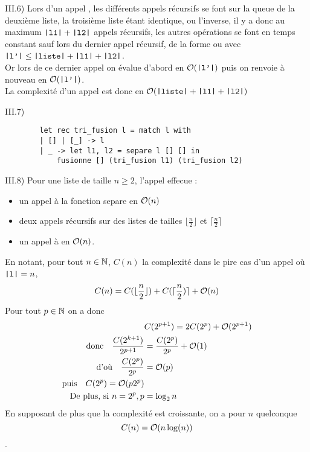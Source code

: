 \begin{question}{III.6) }
    Lors d'un appel , les différents appels récursifs se font sur la queue de la deuxième liste, la troisième liste étant identique, ou l'inverse, il y a donc au maximum $\texttt{|l1|} + \texttt{|l2|}$ appels récursifs, les autres opérations se font en temps constant sauf lors du dernier appel récursif, de la forme  ou  avec $\texttt{|l'|} \leq \texttt{|liste|} + \texttt{|l1|} + \texttt{|l2|}$.\\Or lors de ce dernier appel on évalue d'abord  en $\mathcal{O}(\texttt{|l'|})$ puis on renvoie  à nouveau en $\mathcal{O}(\texttt{|l'|})$. \\ La complexité d'un appel  est donc en $\mathcal{O}(\texttt{|liste|} + \texttt{|l1|} + \texttt{|l2|})$
\end{question}

\begin{question}{III.7) }
    \begin{verbatim}
        let rec tri_fusion l = match l with
        | [] | [_] -> l
        | _ -> let l1, l2 = separe l [] [] in
            fusionne [] (tri_fusion l1) (tri_fusion l2)
    \end{verbatim}
\end{question}

\begin{question}{III.8) }
    Pour une liste  de taille $n \geq 2$, l'appel  effecue : \begin{itemize}
        \item un appel à la fonction separe en $\mathcal{O}(n)$
        \item deux appels récursifs sur des listes de tailles $\lfloor \frac{n}{2} \rfloor $ et $\lceil  \frac{n}{2} \rceil $
        \item un appel à  en $\mathcal{O}(n)$.
    \end{itemize}
    En notant, pour tout $n \in \mathbb{N}$, $C(n)$ la complexité dans le pire cas d'un appel  où $\texttt{|l|} = n$, $$C(n) = C(\lfloor \frac{n}{2}\rfloor) + C(\lceil \frac{n}{2}) \rceil + \mathcal{O}(n)$$
    Pour tout $p \in \mathbb{N}$ on a donc \begin{align*}
        &C(2^{p+1}) = 2C(2^p) + \mathcal{O}(2^{p+1}) \\
        \text{donc}\quad \frac{C(2^{k+1})}{2^{p+1}} &= \frac{C(2^p)}{2^p} + \mathcal{O}(1) \\
        \text{d'où}\quad \frac{C(2^p)}{2^p} &= \mathcal{O}(p) \\
        \text{puis}\quad C(2^p) = \mathcal{O}(p2^p) \\
        \text{De plus, si $n = 2^p$}, p &= \log_2{n}
    \end{align*}
    En supposant de plus que la complexité est croissante, on a pour $n$ quelconque $$C(n) = \mathcal{O}(n \log(n))$$.
\end{question}
